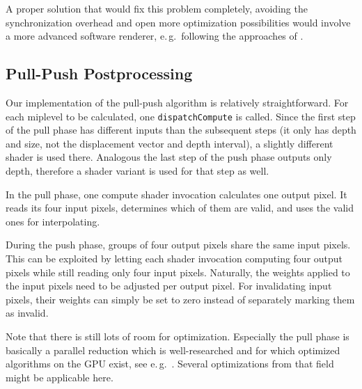 A proper solution that would fix this problem completely, avoiding the synchronization overhead and open more optimization possibilities would involve a more advanced software renderer, e.\,g.\ following the approaches of \citet{Laine:2011:SoftwareRasterization}.


\subsection{Pull-Push Postprocessing}

Our implementation of the pull-push algorithm is relatively straightforward. For each miplevel to be calculated, one \texttt{dispatchCompute} is called. Since the first step of the pull phase has different inputs than the subsequent steps (it only has depth and size, not the displacement vector and depth interval), a slightly different shader is used there. Analogous the last step of the push phase outputs only depth, therefore a shader variant is used for that step as well.

In the pull phase, one compute shader invocation calculates one output pixel. It reads its four input pixels, determines which of them are valid, and uses the valid ones for interpolating.


During the push phase, groups of four output pixels share the same input pixels. This can be exploited by letting each shader invocation computing four output pixels while still reading only four input pixels. Naturally, the weights applied to the input pixels need to be adjusted per output pixel. For invalidating input pixels, their weights can simply be set to zero instead of separately marking them as invalid.


Note that there is still lots of room for optimization. Especially the pull phase is basically a parallel reduction which is well-researched and for which optimized algorithms on the GPU exist, see e.\,g.\ \citet{Harris:2007:ParallelReduction}. Several optimizations from that field might be applicable here.



